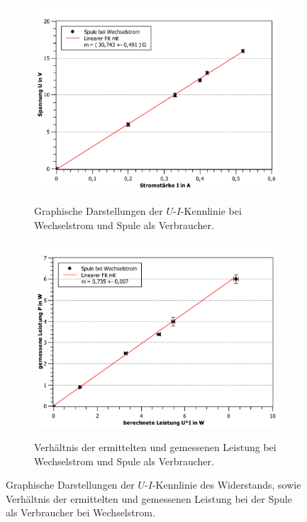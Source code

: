 \begin{figure}[ht]
	
	\centering	
	\begin{subfigure}{0.70\textwidth}
		\centering
		\includegraphics[width=\textwidth]{auswertung/spule-wechsel-Widerstand.pdf}
		\label{fig:7}
		\caption{Graphische Darstellungen der $U$-$I$-Kennlinie bei Wechselstrom und Spule als Verbraucher.}	
	\end{subfigure}
	\begin{subfigure}{0.70\textwidth}
		\centering
		\includegraphics[width=\textwidth]{auswertung/spule-wechsel-Leistung.pdf}
		\label{fig:8}
		\caption{Verhältnis der ermittelten und gemessenen Leistung bei Wechselstrom und Spule als Verbraucher.}	
	\end{subfigure}
	\caption{Graphische Darstellungen der $U$-$I$-Kennlinie des Widerstands, sowie Verhältnis der ermittelten und gemessenen Leistung bei der Spule als Verbraucher bei Wechselstrom.}
	\label{fig:Spule_wechsel}
\end{figure}
